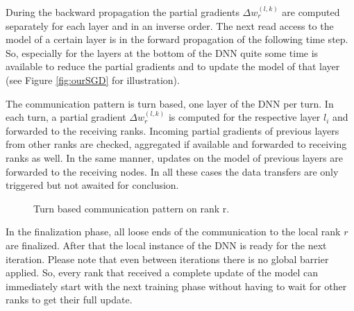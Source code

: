 \documentclass[twoside,twocolumn]{article}
\begin{document}
During the backward propagation the partial gradients $\Delta w^{(l,k)}_r$
are computed separately for each layer and in an inverse order.
The next read access to the model of a certain layer is in the forward propagation of
the following time step. So, especially for the layers at the bottom of the DNN
quite some time is available to reduce the partial gradients and to
update the model of that layer (see Figure \ref{fig:ourSGD} for illustration).

The communication pattern is turn based, one layer of the DNN per turn.
In each turn, a partial gradient $\Delta w^{(l,k)}_r$ is computed for the
respective layer $l_i$
and  forwarded to the receiving ranks.  Incoming partial gradients of previous layers from other
ranks are checked, aggregated if available and forwarded to receiving ranks 
as well.
In the same manner, updates on the model of previous layers are forwarded to
the receiving nodes. In all these cases the data transfers are only triggered but not
awaited for conclusion.

\begin{figure}[htbp]
\centering%
\begin{algorithmic}[1]

\ENDFOR
{}

\end{algorithmic}
\caption{Turn based communication pattern on rank r.}
\label{fig:algo_communication}
\end{figure}

In the finalization phase, all loose ends of the communication
to the local rank $r$ are
finalized. After that the local instance of the DNN is ready
for the next iteration. Please note that even between  iterations
there is no global barrier applied. So, every rank that received
a complete update of the model can immediately start with the next training
phase without having to wait for other ranks to get their full
update.
\end{document}
